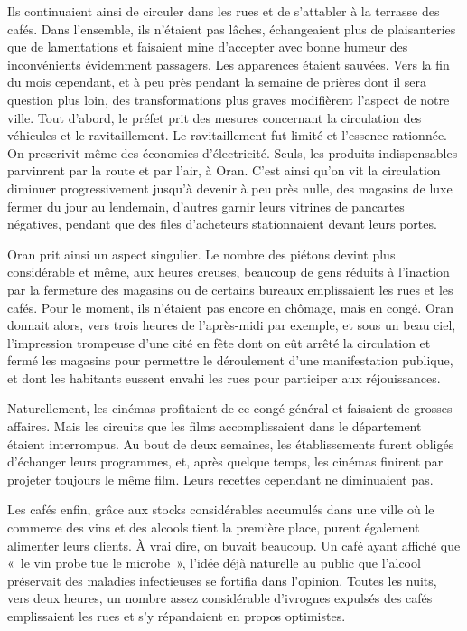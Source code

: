 \documentclass[french,twoside]{book} %
\begin{document}
Ils continuaient ainsi de circuler dans les rues et de s’attabler à la terrasse des cafés. Dans l’ensemble, ils n’étaient pas lâches, échangeaient plus de plaisanteries que de lamentations et faisaient mine d’accepter avec bonne humeur des inconvénients évidemment passagers. Les apparences étaient sauvées. Vers la fin du mois cependant, et à peu près pendant la semaine de prières dont il sera question plus loin, des transformations plus graves modifièrent l’aspect de notre ville. Tout d’abord, le préfet prit des mesures concernant la circulation des véhicules et le ravitaillement. Le ravitaillement fut limité et l’essence rationnée. On prescrivit même des économies d’électricité. Seuls, les produits indispensables parvinrent par la route et par l’air, à Oran. C’est ainsi qu’on vit la circulation diminuer progressivement jusqu’à devenir à peu près nulle, des magasins de luxe fermer du jour au lendemain, d’autres garnir leurs vitrines de pancartes négatives, pendant que des files d’acheteurs stationnaient devant leurs portes.\par
Oran prit ainsi un aspect singulier. Le nombre des piétons devint plus considérable et même, aux heures creuses, beaucoup de gens réduits à l’inaction par la fermeture des magasins ou de certains bureaux emplissaient les rues et les cafés. Pour le moment, ils n’étaient pas encore en chômage, mais en congé. Oran donnait alors, vers trois heures de l’après-midi par exemple, et sous un beau ciel, l’impression trompeuse d’une cité en fête dont on eût arrêté la circulation et fermé les magasins pour permettre le déroulement d’une manifestation publique, et dont les habitants eussent envahi les rues pour participer aux réjouissances.\par
Naturellement, les cinémas profitaient de ce congé général et faisaient de grosses affaires. Mais les circuits que les films accomplissaient dans le département étaient interrompus. Au bout de deux semaines, les établissements furent obligés d’échanger leurs programmes, et, après quelque temps, les cinémas finirent par projeter toujours le même film. Leurs recettes cependant ne diminuaient pas.\par
Les cafés enfin, grâce aux stocks considérables accumulés dans une ville où le commerce des vins et des alcools tient la première place, purent également alimenter leurs clients. À vrai dire, on buvait beaucoup. Un café ayant affiché que « le vin probe tue le microbe », l’idée déjà naturelle au public que l’alcool préservait des maladies infectieuses se fortifia dans l’opinion. Toutes les nuits, vers deux heures, un nombre assez considérable d’ivrognes expulsés des cafés emplissaient les rues et s’y répandaient en propos optimistes.\par
\end{document}
